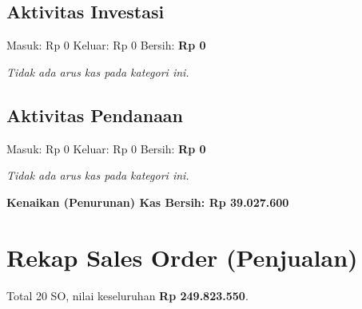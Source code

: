 \documentclass[11pt,a4paper]{article}
\begin{document}
\subsection{Aktivitas Investasi}
Masuk: Rp 0 \quad Keluar: Rp 0 \quad Bersih: \textbf{Rp 0}

\textit{Tidak ada arus kas pada kategori ini.}

\subsection{Aktivitas Pendanaan}
Masuk: Rp 0 \quad Keluar: Rp 0 \quad Bersih: \textbf{Rp 0}

\textit{Tidak ada arus kas pada kategori ini.}

\vspace{2pt}\noindent\colorbox{soft}{\parbox{\dimexpr\linewidth-2\fboxsep}{\textbf{Kenaikan (Penurunan) Kas Bersih: Rp 39.027.600}}}\vspace{4pt}

\section{Rekap Sales Order (Penjualan)}
Total 20 SO, nilai keseluruhan \textbf{Rp 249.823.550}.
\end{document}
